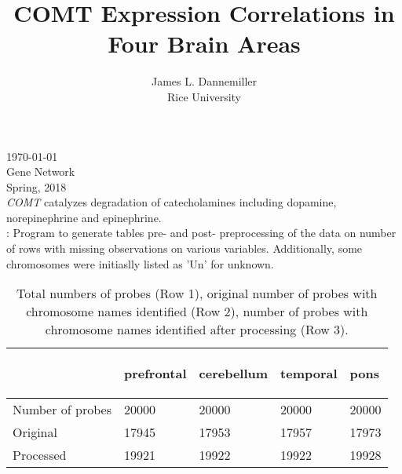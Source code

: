 \documentclass[11pt]{article}
\begin{document}

 

\author{James L. Dannemiller \\ Rice University}
\title{COMT Expression Correlations in Four Brain Areas}
\maketitle
\today \\
Gene Network\\
Spring, 2018\\
{\textit {COMT}} catalyzes degradation of catecholamines including dopamine, norepinephrine and epinephrine.\\

\textrangle{}: Program to generate tables pre- and post- preprocessing of the data on number of rows with missing observations on various variables. Additionally, some chromosomes were initiaslly listed as 'Un' for unknown.\\







% 
\begin{table}[ht]
\centering
\caption{Total numbers of probes (Row 1), original number of probes with chromosome names identified (Row 2), number of probes with chromosome names identified after processing (Row 3).} 
\begin{tabularx}{\textwidth}{lXXXX}
  \hline
 & \begin{sideways} prefrontal \end{sideways} & \begin{sideways} cerebellum \end{sideways} & \begin{sideways} temporal \end{sideways} & \begin{sideways} pons \end{sideways} \\ 
  \hline
Number of probes & 20000 & 20000 & 20000 & 20000 \\ 
  Original & 17945 & 17953 & 17957 & 17973 \\ 
  Processed & 19921 & 19922 & 19922 & 19928 \\ 
   \hline
\end{tabularx}
\end{table}
\vspace{1em}
\end{document}

